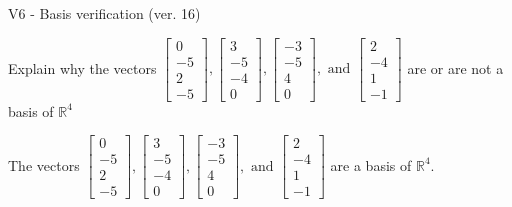 \begin{exercise}
  \begin{exerciseTitle}V6 - Basis verification (ver. 16)\end{exerciseTitle}
  \begin{exerciseStatement}
    Explain why the vectors \(\left[\begin{array}{r}
0 \\
-5 \\
2 \\
-5
\end{array}\right] , \left[\begin{array}{r}
3 \\
-5 \\
-4 \\
0
\end{array}\right] , \left[\begin{array}{r}
-3 \\
-5 \\
4 \\
0
\end{array}\right] , \text{ and } \left[\begin{array}{r}
2 \\
-4 \\
1 \\
-1
\end{array}\right]\) are or are not a basis of \(\mathbb{R}^4\)	


  \end{exerciseStatement}
  \begin{exerciseAnswer}
   The vectors \(\left[\begin{array}{r}
0 \\
-5 \\
2 \\
-5
\end{array}\right] , \left[\begin{array}{r}
3 \\
-5 \\
-4 \\
0
\end{array}\right] , \left[\begin{array}{r}
-3 \\
-5 \\
4 \\
0
\end{array}\right] , \text{ and } \left[\begin{array}{r}
2 \\
-4 \\
1 \\
-1
\end{array}\right]\) 
  	 are  a basis of \(\mathbb{R}^4\).
  


  \end{exerciseAnswer}
\end{exercise}